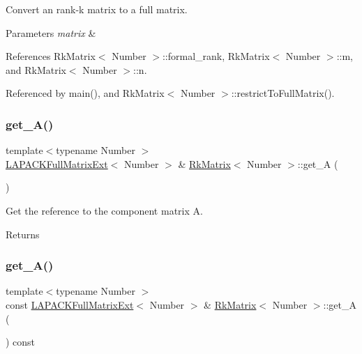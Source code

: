 Convert an rank-\/k matrix to a full matrix. 
\begin{DoxyParams}{Parameters}
{\em matrix} & \\
\hline
\end{DoxyParams}


References Rk\+Matrix$<$ Number $>$\+::formal\+\_\+rank, Rk\+Matrix$<$ Number $>$\+::m, and Rk\+Matrix$<$ Number $>$\+::n.



Referenced by main(), and Rk\+Matrix$<$ Number $>$\+::restrict\+To\+Full\+Matrix().

\mbox{\label{classRkMatrix_accfea435fd26c622e491bee475ae788c}} 
\subsubsection{\texorpdfstring{get\+\_\+\+A()}{get\_A()}\hspace{0.1cm}{\footnotesize\ttfamily [1/2]}}
{\footnotesize\ttfamily template$<$typename Number $>$ \\
\hyperlink{classLAPACKFullMatrixExt}{L\+A\+P\+A\+C\+K\+Full\+Matrix\+Ext}$<$ Number $>$ \& \hyperlink{classRkMatrix}{Rk\+Matrix}$<$ Number $>$\+::get\+\_\+A (\begin{DoxyParamCaption}{ }\end{DoxyParamCaption})}

Get the reference to the component matrix {\ttfamily A}. \begin{DoxyReturn}{Returns}

\end{DoxyReturn}
\mbox{\label{classRkMatrix_a95e786794895f1ceae2e0f2880e105b3}} 
\subsubsection{\texorpdfstring{get\+\_\+\+A()}{get\_A()}\hspace{0.1cm}{\footnotesize\ttfamily [2/2]}}
{\footnotesize\ttfamily template$<$typename Number $>$ \\
const \hyperlink{classLAPACKFullMatrixExt}{L\+A\+P\+A\+C\+K\+Full\+Matrix\+Ext}$<$ Number $>$ \& \hyperlink{classRkMatrix}{Rk\+Matrix}$<$ Number $>$\+::get\+\_\+A (\begin{DoxyParamCaption}{ }\end{DoxyParamCaption}) const}

